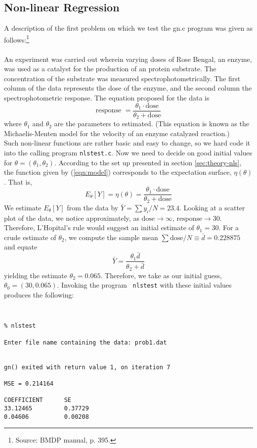 \documentclass{article}
\begin{document}
\subsection{Non-linear Regression}
\label{sec:results-nls}
A description of the first problem on which we test the gn.c program
was given as follows:\footnote{Source: BMDP manual, p. 395.}
\\\\
{\small
An experiment was carried out wherein varying doses of 
Rose Bengal, an enzyme, was used as a catalyst for the 
production of an protein substrate.  The concentration
of the substrate was measured spectrophotometrically.
The first column of the data represents the dose of the
enzyme, and the second column the spectrophotometric
response.  The equation proposed for the data is
\begin{equation}
\label{eqn:model}
\mbox{response } = \frac{\theta_1\cdot \mbox{dose}}{\theta_2 +
  \mbox{dose}}
 \end{equation}
where $\theta_1$ and $\theta_2$ are the parameters to estimated.  
(This equation is known as the Michaelis-Menten model for the 
velocity of an enzyme catalyzed reaction.)
}
\\

Such non-linear functions are rather basic and easy to change,
so we hard code it into the calling program {\tt nlstest.c}.  
Now we need to decide on 
good initial values for $\theta = (\theta_1,\theta_2)$.
According to the set up presented in section \ref{sec:theory-nls},
the function given by (\ref{eqn:model}) corresponds to the 
expectation surface, $\eta(\theta)$.  That is,
\[E_{\theta}[Y] = \eta(\theta) = \frac{\theta_1\cdot \mbox{dose}}{\theta_2 +
  \mbox{dose}}\]
We estimate $E_{\theta}[Y]$ from the data by $\bar Y = \sum y_i /N = 23.4$.
Looking at a scatter plot of the data, we notice approximately, as $\mbox{dose}
\rightarrow \infty$, $\mbox{response} \rightarrow 30$.  Therefore, 
L'Hopital's rule would suggest an initial estimate of $\theta_1 = 30$.
For a crude estimate of $\theta_2$, we compute the sample mean 
$\sum \mbox{dose}/N \equiv \bar d = 0.228875$ and equate 
\[\bar Y = \frac{\theta_1 \bar d}{\theta_2 + \bar d} \]
yielding the estimate $\theta_2 = 0.065$.  Therefore, we take as our
initial guess, $\theta_0 = (30, 0.065)$.  Invoking the program {\tt
  nlstest} with these initial values produces the following:
{\tt 
\begin{verbatim}
% nlstest
 
Enter file name containing the data: prob1.dat
 
 
gn() exited with return value 1, on iteration 7
 
MSE = 0.214164
 
COEFFICIENT      SE 
33.12465         0.37729
0.04606          0.00208
\end{verbatim}
}
\end{document}
